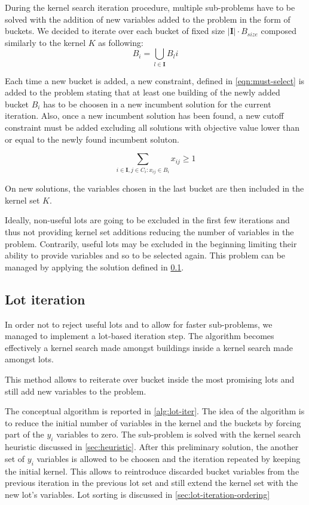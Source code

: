 \documentclass[a4paper, twocolumn, oneside]{article}
\begin{document}
During the kernel search iteration procedure, multiple sub-problems have to be solved with the addition of new variables added to the problem in the form of buckets. We decided to iterate over each bucket of fixed size \(|\mathbf{I}| \cdot B_{size}\) composed similarly to the kernel \(K\) as following: \[B_i = \bigcup_{l \in \mathbf{I}} B_li\]

Each time a new bucket is added, a new constraint, defined in \cref{eqn:must-select} is added to the problem stating that at least one building of the newly added bucket \(B_i\) has to be choosen in a new incumbent solution for the current iteration. Also, once a new incumbent solution has been found, a new cutoff constraint must be added excluding all solutions with objective value lower than or equal to the newly found incumbent soluton.

\begin{equation}\label{eqn:must-select}
	\sum_{i \in \mathbf{I}, j \in C_i : x_{ij} \in B_i} x_{ij} \geq 1 
\end{equation}

On new solutions, the variables chosen in the last bucket are then included in the kernel set \(K\).

Ideally, non-useful lots are going to be excluded in the first few iterations and thus not providing kernel set additions reducing the number of variables in the problem. Contrarily, useful lots may be excluded in the beginning limiting their ability to provide variables and so to be selected again. This problem can be managed by applying the solution defined in \cref{sec:lot-iteration}.

\subsection{Lot iteration}\label{sec:lot-iteration}
In order not to reject useful lots and to allow for faster sub-problems, we managed to implement a lot-based iteration step. The algorithm becomes effectively a kernel search made amongst buildings inside a kernel search made amongst lots.

This method allows to reiterate over bucket inside the most promising lots and still add new variables to the problem.

The conceptual algorithm is reported in \cref{alg:lot-iter}. The idea of the algorithm is to reduce the initial number of variables in the kernel and the buckets by forcing part of the \(y_i\) variables to zero. The sub-problem is solved with the kernel search heuristic discussed in \cref{sec:heuristic}. After this preliminary solution, the another set of \(y_i\) variables is allowed to be choosen and the iteration repeated by keeping the initial kernel. This allows to reintroduce discarded bucket variables from the previous iteration in the previous lot set and still extend the kernel set with the new lot's variables. Lot sorting is discussed in \cref{sec:lot-iteration-ordering}
\end{document}
